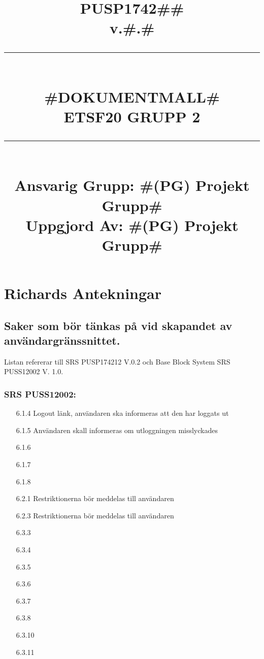 \documentclass[paper=a4, fontsize=11pt,twoside]{article}
\title{
		\documentNumber{#1}																						
		\documentVersion{#2}																				
		\HRule{0.5pt} \\ %
		\LARGE \textbf{\uppercase{#3}} \\
		\large \textbf{\uppercase{ETSF20 Grupp 2}} 
		\HRule{2pt} \\ [1.5cm]    
		\normalsize            
		\documentResponsible{#4} \\ 
		\documentCreator{#4}  
	}
\newcommand{\HRule}[1]{\rule{\linewidth}{#1}}
\newcommand{\documentNumber}[1]{\centering PUSP1742#1 \\[1.0cm]}
\newcommand{\documentVersion}[1]{\centering \small{v.#1} \\[1.0cm]}
\newcommand{\documentResponsible}[1]{\centering  Ansvarig Grupp: #1}
\newcommand{\documentCreator}[1]{\centering Uppgjord Av: #1}
\newcommand{\grouptitlepage}[4]{ 
	\title{
		\documentNumber{#1}																						
		\documentVersion{#2}																				
		\HRule{0.5pt} \\ %
		\LARGE \textbf{\uppercase{#3}} \\
		\large \textbf{\uppercase{ETSF20 Grupp 2}} 
		\HRule{2pt} \\ [1.5cm]    
		\normalsize            
		\documentResponsible{#4} \\ 
		\documentCreator{#4}  
	}																							
	\maketitle																							
	\thispagestyle{empty} 																					
	\newpage 
}
\begin{document}
\grouptitlepage
{\#\#}
{\#.\#}
{\#Dokumentmall\#}
{\#(PG) Projekt Grupp\#}
\tableofcontents

\section{Richards Antekningar}

\subsection{Saker som bör tänkas på vid skapandet av användargränssnittet.}
Listan refererar till SRS PUSP174212 V.0.2 och Base Block System SRS PUSS12002 V. 1.0.

\subsubsection{SRS PUSS12002:}
\begin{itemize}
\item[6.1.4] Logout länk, användaren ska informeras att den har loggats ut
\item[6.1.5] Användaren skall informeras om utloggningen misslyckades
\item[6.1.6]
\item[6.1.7]
\item[6.1.8]

\item[6.2.1] Restriktionerna bör meddelas till användaren
\item[6.2.3] Restriktionerna bör meddelas till användaren

\item[6.3.3]
\item[6.3.4]
\item[6.3.5]
\item[6.3.6]
\item[6.3.7]
\item[6.3.8]
\item[6.3.10]
\item[6.3.11]
\end{itemize}




% 
% 
\end{document}
